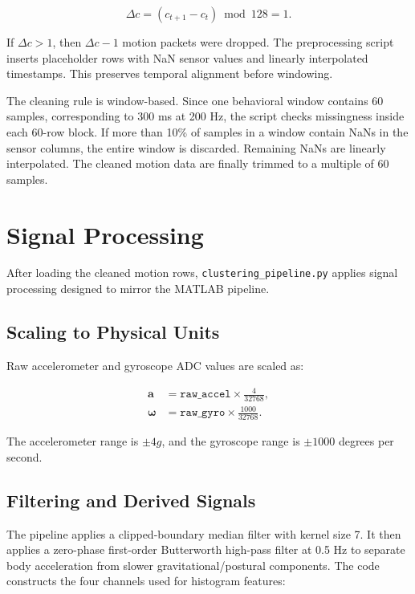 \documentclass[11pt]{article}
\begin{document}
\begin{equation}
    \Delta c = (c_{t+1} - c_t) \bmod 128 = 1.
\end{equation}

If $\Delta c > 1$, then $\Delta c - 1$ motion packets were dropped. The preprocessing script inserts placeholder rows with NaN sensor values and linearly interpolated timestamps. This preserves temporal alignment before windowing.

The cleaning rule is window-based. Since one behavioral window contains 60 samples, corresponding to 300 ms at 200 Hz, the script checks missingness inside each 60-row block. If more than 10\% of samples in a window contain NaNs in the sensor columns, the entire window is discarded. Remaining NaNs are linearly interpolated. The cleaned motion data are finally trimmed to a multiple of 60 samples.

\FloatBarrier
\section{Signal Processing}

After loading the cleaned motion rows, \texttt{clustering\_pipeline.py} applies signal processing designed to mirror the MATLAB pipeline.

\subsection{Scaling to Physical Units}

Raw accelerometer and gyroscope ADC values are scaled as:

\begin{align}
    \mathbf{a} &= \texttt{raw\_accel} \times \frac{4}{32768}, \\
    \boldsymbol{\omega} &= \texttt{raw\_gyro} \times \frac{1000}{32768}.
\end{align}

The accelerometer range is $\pm 4g$, and the gyroscope range is $\pm 1000$ degrees per second.

\subsection{Filtering and Derived Signals}

The pipeline applies a clipped-boundary median filter with kernel size 7. It then applies a zero-phase first-order Butterworth high-pass filter at 0.5 Hz to separate body acceleration from slower gravitational/postural components. The code constructs the four channels used for histogram features:
\end{document}

